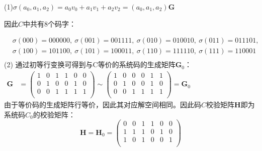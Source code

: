 \begin{Solution}
    (1)$\sigma(a_0,a_1,a_2) = a_0v_0 + a_1v_1 + a_2v_2 = (a_0,a_1,a_2)\bm{G}$
    
    因此$C$中共有$8$个码字：

    $
    \begin{aligned}
        &\sigma(000) = 000000,~
        \sigma(001) = 001111,~
        \sigma(010) = 010010,~
        \sigma(011) = 011101,\\
        &\sigma(100) = 101100,~
        \sigma(101) = 100011,~
        \sigma(110) = 111110,~
        \sigma(111) = 110001\\
    \end{aligned}
    $\\

    (2) 通过初等行变换可得到与C等价的系统码的生成矩阵$\bm{G}_0$：\\

    $
    \begin{aligned}
        \bm{G} &= \left(
        \begin{matrix}
            1 &0 &1 &1 &0 &0\\
            0 &1 &0 &0 &1 &0\\
            0 &0 &1 &1 &1 &1\\
        \end{matrix}
    \right)
    \sim
    \left(
        \begin{matrix}
            1 &0 &0 &0 &1 &1\\
            0 &1 &0 &0 &1 &0\\
            0 &0 &1 &1 &1 &1\\
        \end{matrix}
    \right)
    = \bm{G}_0
    \end{aligned}
    $\\

    由于等价码的生成矩阵行等价，因此其对应解空间相同。因此码$C$校验矩阵$\bm{H}$即为系统码$C_0$的校验矩阵：
    \begin{equation}
        \bm{H} = \bm{H}_0=
        \left(
            \begin{matrix}
                0 &0 &1 &1 &0 &0\\
                1 &1 &1 &0 &1 &0\\
                1 &0 &1 &0 &0 &1\\
            \end{matrix}
        \right)
    \end{equation}

\end{Solution}